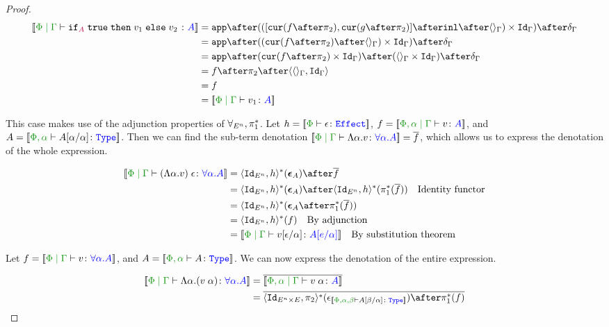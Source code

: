 \begin{framed}
\begin{proof}
    \begin{equation}
        \begin{split}
            \deno{\gpetyperelation{\pifthenelse{A}{\t}{v_1}{v_2}}{A}} & = \ifMorph{\inl\after\term{\G}}{f}{g} \\
            & = \app\after((\cur{f\after\pp}\after\term{\G})\times\idg)\after\diag{\G}\\
            & = \app\after(\cur{f\after\pp}\times\idg)\after(\term{\G}\times\idg)\after\diag{\G}\\
            & = f\after\pp\after\pr{\term{\G}}{\idg}\\
            & = f \\
            & = \deno{\gpetyperelation{v_1}{A}}\\
        \end{split}
    \end{equation}
    
    \case{\eqeffbeta}
    This case makes use of the adjunction properties of $\forall_{E^n}, \pi_1^*$. Let  $h = \deno{\typerelation{\P}{\e}{\effect}}$, $f = \deno{\etyperelation{\P,\a}{\G}{v}{A}}$, and $A = \deno{\typerelation{\P,\a}{A\ssub{\a}{\a}}{\type}}$. Then we can find the sub-term denotation $\deno{\gpetyperelation{\elam{\a}{v}}{\all{\a}{A}}} = \bar{f}$, which allows us to express the denotation of the whole expression.
    
    \begin{align*}
        \deno{\gpetyperelation{\eapp{(\elam{\a}{v})}{\e}}{\all{\a}{A}}} & = \pr{\Id{E^n}}{h}\star(\counit{A})\after\bar{f}\\
        & = \pr{\Id{E^n}}{h}\star(\counit{A})\after\pr{\Id{E^n}}{h}\star(\pstar(\bar{f}))\qt{Identity functor}\\
        &= \pr{\Id{E^n}}{h}\star(\counit{A}\after\pstar(\bar{f}))\\
        &= \pr{\Id{E^n}}{h}\star(f)\qt{By adjunction}\\
        &= \deno{\gpetyperelation{v\ssub{\a}{\e}}{A\ssub{\a}{e}}}\qt{By substitution theorem}\\
    \end{align*}
    
    \case{\eqeffeta}
        Let $f  = \deno{\gpetyperelation{v}{\all{\a}{A}}}$, and $A  = \deno{\typerelation{\P,\a}{A}{\type}}$. We can now express the denotation of the entire expression.
    
        \begin{align*}
            \deno{\gpetyperelation{\elam{\a}{(\eapp{v}{\a})}}{\all{\a}{A}}} & = \bar{\deno{\etyperelation{\P,\a}{\G}{\eapp{v}{\a}}{A}}} \\
            & = \bar{\pr{\Id{E^n\times E}}{\pp}\star(\e_{\deno{\typerelation{\P,\a,\b}{A\ssub{\a}{\b}}{\type}}})\after\pstar(f)}
        \end{align*}
    

\end{proof}
\end{framed}
